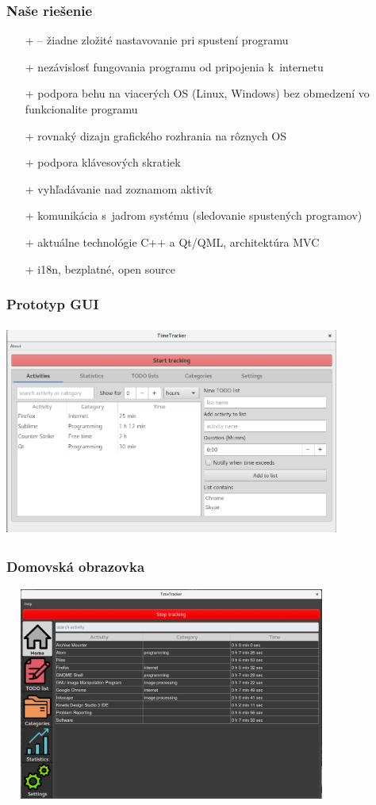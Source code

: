 \documentclass[10pt,xcolor=pdflatex]{beamer}
\begin{document}
\begin{frame}
	\frametitle{Naše riešenie}
	\begin{itemize}
		\item[+]  -- žiadne zložité nastavovanie pri spustení programu
		\item[+] nezávislosť fungovania programu od pripojenia k~internetu
		\item[+] podpora behu na viacerých OS (Linux, Windows) bez obmedzení vo funkcionalite programu
		\item[+] rovnaký dizajn grafického rozhrania na rôznych OS
		\item[+] podpora klávesových skratiek
		\item[+]  vyhľadávanie nad zoznamom aktivít
		\item[+] komunikácia s~jadrom systému (sledovanie spustených programov)
		\item[+] aktuálne technológie C++ a Qt/QML, architektúra MVC
		\item[+] i18n, bezplatné, open source
	\end{itemize}
\end{frame}

\begin{frame}
	\frametitle{Prototyp GUI}
	\includegraphics[width=11cm, height=7cm]{prototyp_gui}
\end{frame}



\begin{frame}
	\frametitle{Domovská obrazovka}
	\includegraphics[width=11cm, height=7cm]{mainwindow}
\end{frame}
\end{document}
